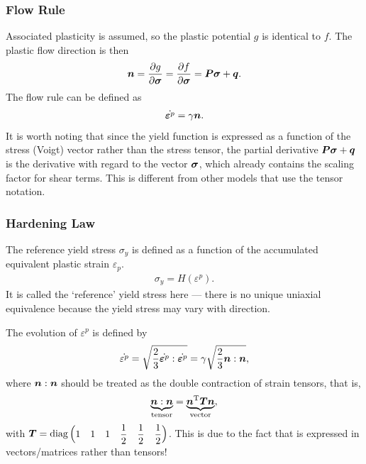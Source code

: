 \subsubsection{Flow Rule}
Associated plasticity is assumed, so the plastic potential $g$ is identical to $f$.
The plastic flow direction is then
\begin{gather}
    \bm{n}=\dfrac{\partial{g}}{\partial{\bm{\sigma}}}=\dfrac{\partial{f}}{\partial{\bm{\sigma}}}=\bm{P}\bm{\sigma}+\bm{q}.
\end{gather}
The flow rule can be defined as
\begin{gather}
    \dot{\bm{\varepsilon}^p}=\gamma\bm{n}.
\end{gather}
It is worth noting that since the yield function is expressed as a function of the stress (Voigt) vector rather than the stress tensor, the partial derivative $\bm{P}\bm{\sigma}+\bm{q}$ is the derivative with regard to the vector $\bm{\sigma}$, which already contains the scaling factor for shear terms.
This is different from other models that use the tensor notation.
\subsubsection{Hardening Law}
The reference yield stress $\sigma_y$ is defined as a function of the accumulated equivalent plastic strain $\varepsilon_{p}$.
\begin{gather}
    \sigma_y=H\left(\varepsilon^{p}\right).
\end{gather}
It is called the `reference' yield stress here --- there is no unique uniaxial equivalence because the yield stress may vary with direction.

The evolution of $\varepsilon^{p}$ is defined by
\begin{gather}
    \dot{\varepsilon^p}=\sqrt{\dfrac{2}{3}\dot{\bm{\varepsilon}^p}:\dot{\bm{\varepsilon}^p}}=\gamma\sqrt{\dfrac{2}{3}\bm{n}:\bm{n}},
\end{gather}
where $\bm{n}:\bm{n}$ should be treated as the double contraction of strain tensors, that is,
\begin{gather}
    \underbrace{\bm{n}:\bm{n}}_\text{tensor}=\underbrace{\bm{n}^{\mathrm{T}}\bm{T}\bm{n}}_\text{vector},
\end{gather}
with $\bm{T}=\text{diag}\left(\begin{matrix}
            1 & 1 & 1 & \dfrac{1}{2} & \dfrac{1}{2} & \dfrac{1}{2}
        \end{matrix}\right)$.
This is due to the fact that  is expressed in vectors/matrices rather than tensors!

